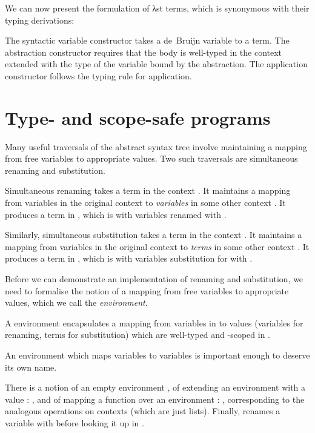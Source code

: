 \documentclass[bsc,frontabs,oneside,singlespacing,parskip,deptreport]{infthesis}
\theoremstyle{definition}
\theoremstyle{lemma}
\begin{document}

We can now present the formulation of λst terms, which is synonymous
with their typing derivations:


The syntactic variable  constructor takes a de~Bruijn variable to
a term. The abstraction constructor  requires that the body is
well-typed in the context  extended with the type  of the
variable bound by the abstraction. The application constructor
 follows the typing rule for application.


\section{Type- and scope-safe programs}
\label{sec:typ-scop-saf-prog}

Many useful traversals of the abstract syntax tree involve maintaining
a mapping from free variables to appropriate values. Two such
traversals are simultaneous renaming and substitution.

Simultaneous renaming takes a term  in the context . It maintains
a mapping  from variables in the original context  to
\textit{variables} in some other context . It produces a term in
, which is  with variables renamed with .

Similarly, simultaneous substitution takes a term  in the context
. It maintains a mapping  from variables in the original context
 to \textit{terms} in some other context . It produces a
term in , which is  with variables substitution for with .

Before we can demonstrate an implementation of renaming and
substitution, we need to formalise the notion of a mapping from free
variables to appropriate values, which we call the
\textit{environment}.


A environment  encapsulates a mapping from variables in
 to values  (variables for renaming, terms for
substitution) which are well-typed and -scoped in .

An environment which maps variables to variables is important enough
to deserve its own name.


There is a notion of an empty environment , of extending an
environment  with a value : , and of mapping a
function  over an environment : ,
corresponding to the analogous operations on contexts (which are just
lists). Finally,  renames a variable with 
before looking it up in .
\end{document}
